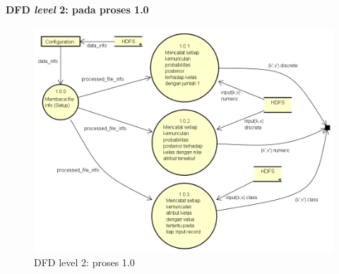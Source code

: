 \paragraph{DFD \textit{level} 2: pada proses 1.0}
\begin{figure}[H]
	\centering
	\includegraphics[scale=0.5]{Diagram/DFD_1_1_Training_Map}
	\caption[DFD level 2: proses 1.0]{DFD level 2: proses 1.0}
	\label{fig:DFD level 2: proses 1.0}
\end{figure}

